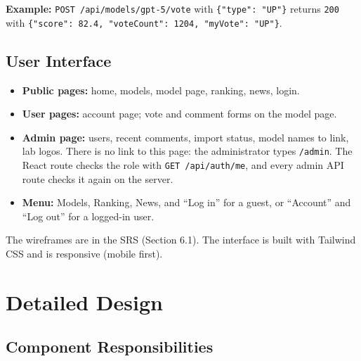 \documentclass[11pt,a4paper]{article}
\begin{document}
\textbf{Example:} \texttt{POST /api/models/gpt-5/vote} with \texttt{\{"type": "UP"\}} returns \texttt{200} with \texttt{\{"score": 82.4, "voteCount": 1204, "myVote": "UP"\}}.

\subsection{User Interface}

\begin{itemize}
  \item \textbf{Public pages:} home, models, model page, ranking, news, login.
  \item \textbf{User pages:} account page; vote and comment forms on the model page.
  \item \textbf{Admin page:} users, recent comments, import status, model names to link, lab logos. There is no link to this page: the administrator types \texttt{/admin}. The React route checks the role with \texttt{GET /api/auth/me}, and every admin API route checks it again on the server.
  \item \textbf{Menu:} Models, Ranking, News, and ``Log in'' for a guest, or ``Account'' and ``Log out'' for a logged-in user.
\end{itemize}

The wireframes are in the SRS (Section 6.1). The interface is built with Tailwind CSS and is responsive (mobile first).

\section{Detailed Design}

\subsection{Component Responsibilities}
\end{document}
